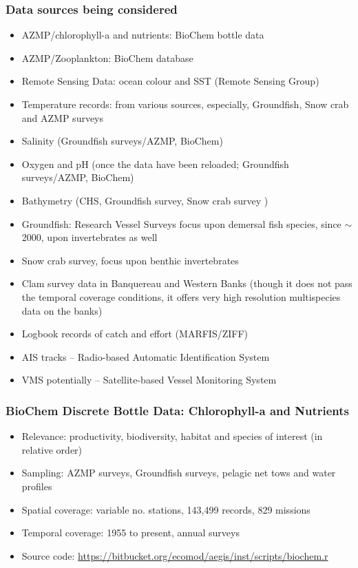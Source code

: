 \documentclass{beamer}
\numberwithin{figure}{section}		%
\numberwithin{table}{section}				%
\begin{document}
\begin{frame}[shrink]
  \frametitle{Data sources being considered}
\begin{itemize}
	\item AZMP/chlorophyll-a and nutrients: BioChem bottle data 
  \item AZMP/Zooplankton: BioChem database 
  \item Remote Sensing Data: ocean colour and SST (Remote Sensing Group)
  \item Temperature records: from various sources, especially, Groundfish, Snow crab and AZMP surveys
  \item Salinity (Groundfish surveys/AZMP, BioChem)
  \item Oxygen and pH (once the data have been reloaded; Groundfish surveys/AZMP, BioChem)
  \item Bathymetry (CHS, Groundfish survey, Snow crab survey )
  \item Groundfish: Research Vessel Surveys focus upon demersal fish species, since $\sim$ 2000, upon invertebrates as well
  \item Snow crab survey, focus upon benthic invertebrates
  \item Clam survey data in Banquereau and Western Banks (though it does not pass the temporal coverage conditions, it offers very high resolution multispecies data on the banks)
  \item Logbook records of catch and effort (MARFIS/ZIFF)
  \item AIS tracks -- Radio-based Automatic Identification System
  \item VMS potentially -- Satellite-based Vessel Monitoring System
\end{itemize}
    
\end{frame}



\begin{frame}
  \frametitle{BioChem Discrete Bottle Data: Chlorophyll-a and Nutrients}
\begin{itemize}
  \item Relevance: productivity, biodiversity, habitat and species of interest (in relative order)
  \item Sampling: AZMP surveys, Groundfish surveys, pelagic net tows and water profiles
  \item Spatial coverage: variable no. stations, 143,499 records, 829 missions
  \item Temporal coverage: 1955 to present, annual surveys
  \item Source code: \url{https://bitbucket.org/ecomod/aegis/inst/scripts/biochem.r}
\end{itemize}
\end{frame}
\end{document}
